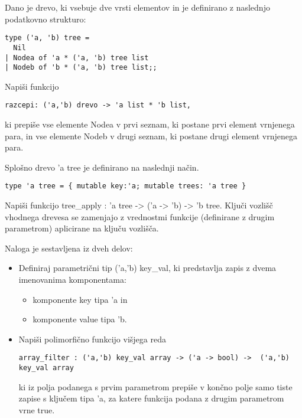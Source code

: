 \begin{ex}
Dano je drevo, ki vsebuje dve vrsti elementov in je definirano z naslednjo podatkovno strukturo:
\begin{lstlisting}
type ('a, 'b) tree = 
  Nil
| Nodea of 'a * ('a, 'b) tree list 
| Nodeb of 'b * ('a, 'b) tree list;; 
\end{lstlisting}
Napi\v si funkcijo 

\begin{lstlisting}
razcepi: ('a,'b) drevo -> 'a list * 'b list, 
\end{lstlisting}
ki prepi\v se vse elemente Nodea v prvi seznam, ki postane prvi element vrnjenega para, in vse elemente Nodeb v drugi seznam, ki postane drugi element vrnjenega para.
\end{ex} 




\begin{ex}
  Splo\v sno drevo 'a tree je definirano na naslednji na\v cin.

\begin{lstlisting}
type 'a tree = { mutable key:'a; mutable trees: 'a tree }
\end{lstlisting}

  Napi\v si funkcijo tree\_apply : 'a tree -> ('a -> 'b) -> 'b
  tree. Klju\v ci vozli\v s\v c vhodnega drevesa se zamenjajo z
  vrednostmi funkcije (definirane z drugim parametrom) aplicirane na
  klju\v cu vozli\v s\v ca.
\end{ex} 




\begin{ex}
  Naloga je sestavljena iz dveh delov:

\begin{itemize}
\item Definiraj parametri\v cni tip ('a,'b) key\_val, ki predstavlja
  zapis z dvema imenovanima komponentama:
  \begin{itemize}
  \item komponente key tipa 'a in
  \item komponente value tipa 'b.
  \end{itemize}
\item Napi\v si polimorfi\v cno funkcijo vi\v sjega reda

\begin{lstlisting}
array_filter : ('a,'b) key_val array -> ('a -> bool) ->  ('a,'b) key_val array
\end{lstlisting}

  ki iz polja podanega s prvim parametrom prepi\v se v kon\v cno polje
  samo tiste zapise s klju\v cem tipa 'a, za katere funkcija podana z
  drugim parametrom vrne true. \end{itemize}
\end{ex}





